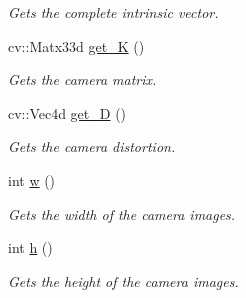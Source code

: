 \begin{DoxyCompactItemize}
\begin{DoxyCompactList}\small\item\em Gets the complete intrinsic vector. \end{DoxyCompactList}\item 
\mbox{\label{classov__core_1_1CamBase_a01b8c0f89bf1bde983806b1dc331658c}} 
cv\+::\+Matx33d \hyperlink{classov__core_1_1CamBase_a01b8c0f89bf1bde983806b1dc331658c}{get\+\_\+K} ()
\begin{DoxyCompactList}\small\item\em Gets the camera matrix. \end{DoxyCompactList}\item 
\mbox{\label{classov__core_1_1CamBase_a7ee1a5a19bf68bbf7bcd55dcd56748fb}} 
cv\+::\+Vec4d \hyperlink{classov__core_1_1CamBase_a7ee1a5a19bf68bbf7bcd55dcd56748fb}{get\+\_\+D} ()
\begin{DoxyCompactList}\small\item\em Gets the camera distortion. \end{DoxyCompactList}\item 
\mbox{\label{classov__core_1_1CamBase_a9eea297b76bc8acfe69946699b83d4f5}} 
int \hyperlink{classov__core_1_1CamBase_a9eea297b76bc8acfe69946699b83d4f5}{w} ()
\begin{DoxyCompactList}\small\item\em Gets the width of the camera images. \end{DoxyCompactList}\item 
\mbox{\label{classov__core_1_1CamBase_aa159148b3d1b3789f68c61ca54084e2a}} 
int \hyperlink{classov__core_1_1CamBase_aa159148b3d1b3789f68c61ca54084e2a}{h} ()
\begin{DoxyCompactList}\small\item\em Gets the height of the camera images. \end{DoxyCompactList}\end{DoxyCompactItemize}
